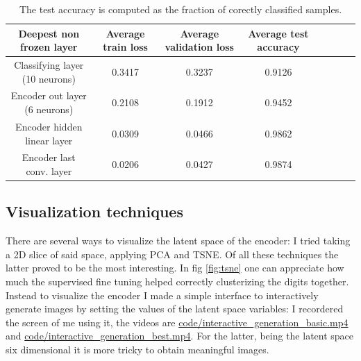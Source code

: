\documentclass[a4paper, 11pt]{article}
\begin{document}
    \begin{table}[H]
      \centering
      \begin{tabular}{c|ccccccc}
        Deepest non frozen layer & Average train loss & Average validation loss & Average test accuracy \\
        \midrule
        Classifying layer (10 neurons) & 0.3417 & 0.3237 & 0.9126 \\
        Encoder out layer (6 neurons) & 0.2108 & 0.1912 & 0.9452 \\
        Encoder hidden linear layer & 0.0309 & 0.0466 & 0.9862 \\
        Encoder last conv. layer & 0.0206 & 0.0427 & 0.9874 \\
        \bottomrule
      \end{tabular}
      \caption{The test accuracy is computed as the fraction of corectly classified samples.}
      \label{tab:sup_ft}
    \end{table}



  \subsection{Visualization techniques}
    There are several ways to visualize the latent space of the encoder: I tried taking a 2D slice of said space, applying PCA and TSNE. Of all these techniques the latter proved to be the most interesting. In fig \ref{fig:tsne} one can appreciate how much the supervised fine tuning helped correctly clusterizing the digits together. Instead to visualize the encoder I made a simple interface to interactively generate images by setting the values of the latent space variables: I recordered the screen of me using it, the videos are \url{code/interactive_generation_basic.mp4} and \url{code/interactive_generation_best.mp4}. For the latter, being the latent space six dimensional it is more tricky to obtain meaningful images.
\end{document}
